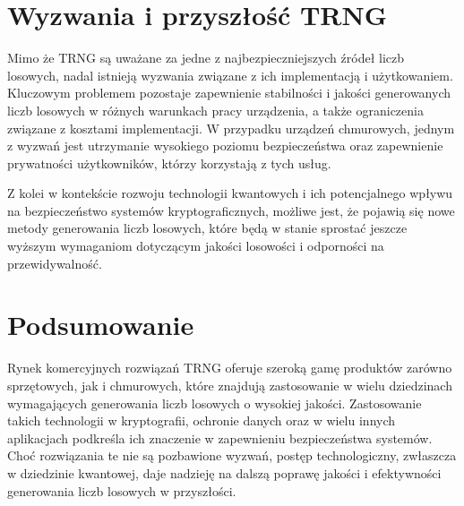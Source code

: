 \section{Wyzwania i przyszłość TRNG}

Mimo że TRNG są uważane za jedne z najbezpieczniejszych źródeł liczb losowych, nadal istnieją wyzwania związane z ich implementacją i użytkowaniem. Kluczowym problemem pozostaje zapewnienie stabilności i jakości generowanych liczb losowych w różnych warunkach pracy urządzenia, a także ograniczenia związane z kosztami implementacji. W przypadku urządzeń chmurowych, jednym z wyzwań jest utrzymanie wysokiego poziomu bezpieczeństwa oraz zapewnienie prywatności użytkowników, którzy korzystają z tych usług.

Z kolei w kontekście rozwoju technologii kwantowych i ich potencjalnego wpływu na bezpieczeństwo systemów kryptograficznych, możliwe jest, że pojawią się nowe metody generowania liczb losowych, które będą w stanie sprostać jeszcze wyższym wymaganiom dotyczącym jakości losowości i odporności na przewidywalność.

\section{Podsumowanie}

Rynek komercyjnych rozwiązań TRNG oferuje szeroką gamę produktów zarówno sprzętowych, jak i chmurowych, które znajdują zastosowanie w wielu dziedzinach wymagających generowania liczb losowych o wysokiej jakości. Zastosowanie takich technologii w kryptografii, ochronie danych oraz w wielu innych aplikacjach podkreśla ich znaczenie w zapewnieniu bezpieczeństwa systemów. Choć rozwiązania te nie są pozbawione wyzwań, postęp technologiczny, zwłaszcza w dziedzinie kwantowej, daje nadzieję na dalszą poprawę jakości i efektywności generowania liczb losowych w przyszłości.
